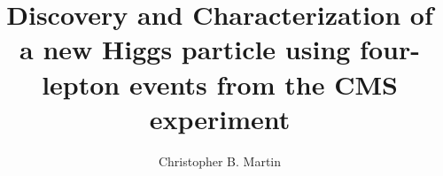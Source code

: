 \documentclass[12pt,twoside,final]{thesis}
\begin{document}
\title{Discovery and Characterization of a new Higgs particle using four-lepton events from the CMS experiment}
\author{Christopher B. Martin}
\dissertation
\doctorphilosophy
\copyrightnotice








%





\begin{vita}
%
\end{vita}
\end{document}
